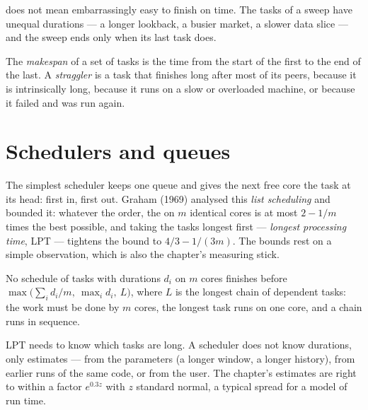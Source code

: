  does not mean embarrassingly easy to finish on time. The tasks of a sweep have unequal durations --- a longer
lookback, a busier market, a slower data slice --- and the sweep ends only when its last task does.

\begin{definition}\label{def:pl:distributed-compute-and-schedulers:makespan}
The \emph{makespan} of a set of tasks is the time from the start of the first to the end of the last. A
\emph{straggler} is a task that finishes long after most of its peers, because it is intrinsically long, because it runs
on a slow or overloaded machine, or because it failed and was run again.
\end{definition}

\section{Schedulers and queues}

The simplest scheduler keeps one queue and gives the next free core the task at its head: first in, first out. Graham (1969) analysed this
\emph{list scheduling} and bounded it: whatever the order, the  on $m$ identical cores is at most $2 - 1/m$ times the best possible,
and taking the tasks longest first --- \emph{longest processing time}, LPT --- tightens the bound to $4/3 - 1/(3m)$. The bounds rest on a
simple observation, which is also the chapter's measuring stick.

\begin{proposition}\label{prop:pl:distributed-compute-and-schedulers:bound}
No schedule of tasks with durations $d_i$ on $m$ cores finishes before $\max\bigl(\sum_i d_i / m,\ \max_i d_i,\ L\bigr)$, where $L$ is the
longest chain of dependent tasks: the work must be done by $m$ cores, the longest task runs on one core, and a chain runs in sequence.
\end{proposition}

\label{lst:pl:distributed-compute-and-schedulers:bound}

LPT needs to know which tasks are long. A scheduler does not know durations, only estimates --- from the parameters (a longer window, a
longer history), from earlier runs of the same code, or from the user. The chapter's estimates are right to within a factor $e^{0.3z}$ with
$z$ standard normal, a typical spread for a model of run time.

